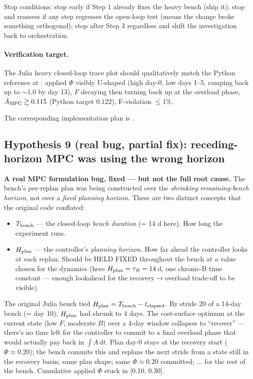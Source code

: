 \documentclass[11pt,a4paper]{article}
\begin{document}
Stop conditions: stop early if Step 1 already fixes the heavy bench
(ship it); stop and reassess if any step regresses the open-loop test
(means the change broke something orthogonal); stop after Step 3
regardless and shift the investigation back to orchestration.

\paragraph{Verification target.} The Julia heavy closed-loop trace
plot  should qualitatively match
the Python reference at
:
applied $\Phi$ visibly U-shaped (high day-0, low days 1--5, ramping
back up to $\sim 1.0$ by day 13), $F$ decaying then turning back up at
the overload phase, $\bar A_{\rm MPC} \gtrsim 0.115$ (Python target
$0.122$), F-violation $\le 1\%$.

The corresponding implementation plan is
.

\subsection{Hypothesis 9 (real bug, partial fix): receding-horizon MPC was using the wrong horizon}

\textbf{A real MPC formulation bug, fixed --- but not the full root cause.} The bench's per-replan plan was being
constructed over the \emph{shrinking remaining-bench horizon}, not over
a \emph{fixed planning horizon}. These are two distinct concepts that
the original code conflated:

\begin{itemize}[itemsep=2pt]
\item $T_{\rm bench}$ --- the closed-loop \emph{bench duration} (= 14 d
  here). How long the experiment runs.
\item $H_{\rm plan}$ --- the controller's \emph{planning horizon}. How
  far ahead the controller looks at each replan.  Should be HELD FIXED
  throughout the bench at a value chosen for the dynamics (here $H_{\rm
  plan} = \tau_B = 14\,$d, one chronic-B time constant --- enough
  lookahead for the recovery$\to$overload trade-off to be visible).
\end{itemize}

The original Julia bench tied $H_{\rm plan} = T_{\rm bench} - t_{\rm
elapsed}$. By stride 20 of a 14-day bench (= day 10), $H_{\rm plan}$
had shrunk to 4 days. The cost-surface optimum at the current state
(low $F$, moderate $B$) over a 4-day window collapses to ``recover''
--- there's no time left for the controller to commit to a final
overload phase that would actually pay back in $\int A\,\mathrm{d}t$.
Plan day-0 stays at the recovery start ($\Phi \approx 0.20$); the
bench commits this and replans the next stride from a state still in
the recovery basin; same plan shape; same $\Phi \approx 0.20$ committed;
$\dots$ for the rest of the bench. Cumulative applied $\Phi$ stuck in
[0.10, 0.30].
\end{document}
